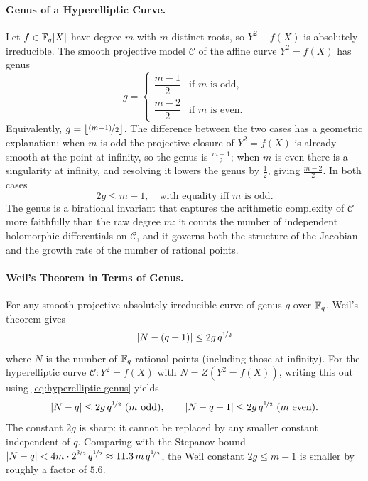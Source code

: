 \paragraph*{Genus of a Hyperelliptic Curve.}
%
Let $f\in\mathbb{F}_q[X]$ have degree $m$ with $m$ distinct roots, so $Y^2-f(X)$ is absolutely irreducible. The smooth projective model $\mathcal{C}$ of the affine curve $Y^2=f(X)$ has genus
\begin{equation}\label{eq:hyperelliptic-genus}
  g = \begin{cases} \dfrac{m-1}{2} & \text{if } m \text{ is odd,} \\[6pt] \dfrac{m-2}{2} & \text{if } m \text{ is even.} \end{cases}
\end{equation}
Equivalently, $g=\lfloor\nicefrac{(m-1)}{2}\rfloor$. The difference between the two cases has a geometric explanation: when $m$ is odd the projective closure of $Y^2=f(X)$ is already smooth at the point at infinity, so the genus is $\frac{m-1}{2}$; when $m$ is even there is a singularity at infinity, and resolving it lowers the genus by $\frac{1}{2}$, giving $\frac{m-2}{2}$. In both cases
$$2g \leq m-1,\quad \text{with equality iff $m$ is odd.}$$
The genus is a birational invariant that captures the arithmetic complexity of $\mathcal{C}$ more faithfully than the raw degree $m$: it counts the number of independent holomorphic differentials on $\mathcal{C}$, and it governs both the structure of the Jacobian and the growth rate of the number of rational points.

\paragraph*{Weil's Theorem in Terms of Genus.}
For any smooth projective absolutely irreducible curve of genus $g$ over $\mathbb{F}_q$, Weil's theorem gives
$$\left| N - (q+1) \right| \leq 2g\,q^{\nicefrac12}$$
where $N$ is the number of $\mathbb{F}_q$-rational points (including those at infinity). For the hyperelliptic curve $\mathcal{C}\colon Y^2=f(X)$ with $N=Z(Y^2=f(X))$, writing this out using \eqref{eq:hyperelliptic-genus} yields
\begin{equation}\label{eq:weil-genus}
  |N-q| \leq 2g\,q^{\nicefrac12}\ (m \text{ odd}), \qquad |N-q+1| \leq 2g\,q^{\nicefrac12}\ (m \text{ even}).
\end{equation}
The constant $2g$ is sharp: it cannot be replaced by any smaller constant independent of $q$. Comparing with the Stepanov bound $|N-q|<4m\cdot 2^{\nicefrac32}\,q^{\nicefrac12}\approx 11.3\,m\,q^{\nicefrac12}$, the Weil constant $2g\leq m-1$ is smaller by roughly a factor of $5.6$.

